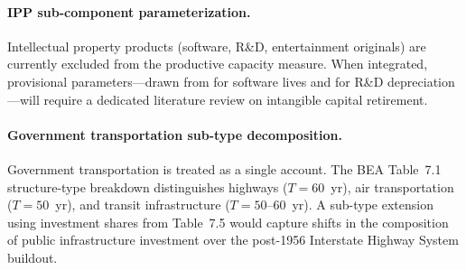 \paragraph{IPP sub-component parameterization.}
Intellectual property products (software, R\&D, entertainment originals) are
currently excluded from the productive capacity measure. When integrated,
provisional parameters---drawn from \citet{Fraumeni1997} for software lives and
\citet{NadiriPrucha1996} for R\&D depreciation---will require a dedicated
literature review on intangible capital retirement.

\paragraph{Government transportation sub-type decomposition.}
Government transportation is treated as a single account. The BEA Table~7.1
structure-type breakdown distinguishes highways ($T = 60$~yr), air transportation
($T = 50$~yr), and transit infrastructure ($T = 50$--$60$~yr). A sub-type
extension using investment shares from Table~7.5 would capture shifts in the
composition of public infrastructure investment over the post-1956 Interstate
Highway System buildout.
